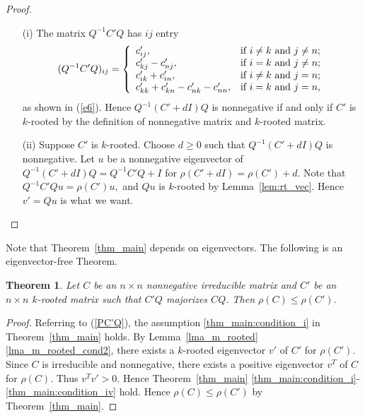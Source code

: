 \documentclass[12pt, a4paper]{article}
\theoremstyle{plain}
\newtheorem{thm}{Theorem}[section]
\theoremstyle{definition}
\begin{document}
\begin{proof}
\begin{enumerate}
  \item[(i)] The matrix $Q^{-1}C'Q$ has $ij$ entry
$$(Q^{-1}C'Q)_{ij}=\left\{
                     \begin{array}{ll}
                       c'_{ij}, & \hbox{if $i\not=k$ and $j\not=n$;} \\
                       c'_{kj}-c'_{nj}, & \hbox{if $i=k$ and $j\not=n$;} \\
                       c'_{ik}+c'_{in}, & \hbox{if $i\not=k$ and $j=n$;} \\ 
                       c'_{kk}+c'_{kn}-c'_{nk}-c'_{nn}, & \hbox{if $i=k$ and $j=n$},
                     \end{array}
                   \right.$$
as shown in (\ref{e6}). 
Hence $Q^{-1}(C'+dI)Q$ is nonnegative if and only if $C'$ is $k$-rooted by the definition of nonnegative matrix and $k$-rooted matrix.
  \item[(ii)] Suppose $C'$ is $k$-rooted. Choose $d\geq 0$ such that $Q^{-1}(C'+dI)Q$ is nonnegative.  
Let $u$ be a nonnegative eigenvector of $Q^{-1}(C'+dI)Q=Q^{-1}C'Q+I$ for $\rho(C'+dI)=\rho(C')+d.$
Note that $Q^{-1}C'Qu=\rho(C')u,$ and $Qu$ is $k$-rooted by Lemma~\ref{lem:rt_vec}. Hence $v'=Qu$ is what we want. 
\end{enumerate}
\end{proof}




Note that Theorem~\ref{thm_main} depends on eigenvectors. The following is an eigenvector-free Theorem. 


\begin{thm}\label{thm:conclusion}
    Let $C$ be an $n\times n$ nonnegative irreducible matrix and $C'$ be an $n\times n$ $k$-rooted matrix such that $C'Q$ majorizes $CQ$. 
 Then $\rho(C)\leq \rho(C')$. 
\end{thm}

\begin{proof} Referring to (\ref{PC'Q}), the assumption \ref{thm_main:condition_i} in  Theorem~\ref{thm_main} holds. 
By Lemma~\ref{lma_m_rooted} \ref{lma_m_rooted_cond2}, there exists a  $k$-rooted eigenvector $v'$ of $C'$  for $\rho(C')$. 
Since $C$ is irreducible and nonnegative, there exists a positive eigenvector $v^T$ of $C$ for $\rho(C).$ 
Thus $v^Tv'>0$. Hence Theorem~\ref{thm_main} \ref{thm_main:condition_i}-\ref{thm_main:condition_iv} hold.
Hence  $\rho(C) \leq \rho(C')$ by   Theorem~\ref{thm_main}.
\end{proof}
\end{document}
